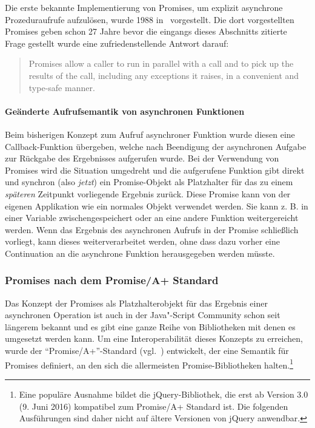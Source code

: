 \documentclass[
11pt, %
a4paper, %
oneside, %
pdfspacing, %
headinclude,
BCOR5mm, %
ngerman, %
bibtotocnumbered,
]{scrartcl}
\begin{document}
			Die erste bekannte Implementierung von Promises, um explizit asynchrone Prozeduraufrufe aufzulösen, wurde 1988 in~\citep[S.~260]{Liskov.1988} vorgestellt. Die dort vorgestellten Promises geben schon 27 Jahre bevor die eingangs dieses Abschnitts zitierte Frage gestellt wurde eine zufriedenstellende Antwort darauf: 
			
			\begin{quote}Promises allow a caller to run in parallel with a call and to pick up the results of the call, including any exceptions it raises, in a convenient and type-safe manner.~\citep[S.~260]{Liskov.1988}\end{quote}
			
			\paragraph{Geänderte Aufrufsemantik von asynchronen Funktionen} Beim bisherigen Konzept zum Aufruf asynchroner Funktion wurde diesen eine Callback-Funktion übergeben, welche nach Beendigung der asynchronen Aufgabe zur Rückgabe des Ergebnisses aufgerufen wurde. Bei der Verwendung von Promises wird die Situation umgedreht und die aufgerufene Funktion gibt direkt und synchron (also \textit{jetzt}) ein Promise-Objekt als Platzhalter für das zu einem \textit{späteren} Zeitpunkt vorliegende Ergebnis zurück. Diese Promise kann von der eigenen Applikation wie ein normales Objekt verwendet werden. Sie kann z. B. in einer Variable zwischengespeichert oder an eine andere Funktion weitergereicht werden. Wenn das Ergebnis des asynchronen Aufrufs in der Promise schließlich vorliegt, kann dieses weiterverarbeitet werden, ohne dass dazu vorher eine Continuation an die asynchrone Funktion herausgegeben werden müsste.
		
		\subsubsection{Promises nach dem Promise/A+ Standard}

			Das Konzept der Promises als Platzhalterobjekt für das Ergebnis einer asynchronen Operation ist auch in der Java"-Script Community schon seit längerem bekannt und es gibt eine ganze Reihe von Bibliotheken mit denen es umgesetzt werden kann. Um eine Interoperabilität dieses Konzepts zu erreichen, wurde der "`Promise/A+"'-Standard (vgl.~\citep{PromisesA+}) entwickelt, der eine Semantik für Promises definiert, an den sich die allermeisten Promise-Bibliotheken halten.\footnote{Eine populäre Ausnahme bildet die \textsf{jQuery}-Bibliothek, die erst ab Version 3.0 (9. Juni 2016) kompatibel zum Promise/A+ Standard ist. Die folgenden Ausführungen sind daher nicht auf ältere Versionen von \textsf{jQuery} anwendbar.} 
			
\end{document}
